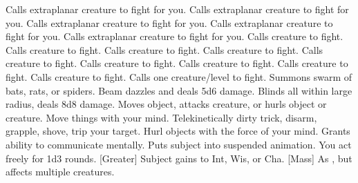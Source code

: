     {Calls extraplanar creature to fight for you.}
    {Calls extraplanar creature to fight for you.}
    {Calls extraplanar creature to fight for you.}
    {Calls extraplanar creature to fight for you.}
    {Calls extraplanar creature to fight for you.}
    {Calls creature to fight.}
    {Calls creature to fight.}
    {Calls creature to fight.}
    {Calls creature to fight.}
    {Calls creature to fight.}
    {Calls creature to fight.}
    {Calls creature to fight.}
    {Calls creature to fight.}
    {Calls creature to fight.}
    {Calls one creature/level to fight.}
    {Summons swarm of bats, rats, or spiders.}
    {Beam dazzles and deals 5d6 damage.}
    {Blinds all within large radius, deals 8d8 damage.}
    {Moves object, attacks creature, or hurls object or creature.}
    {Move things with your mind.}
    {Telekinetically dirty trick, disarm, grapple, shove, trip your target.}
    {Hurl objects with the force of your mind.}
    {Grants ability to communicate mentally. }
    {Puts subject into suspended animation.}
    {You act freely for 1d3 rounds.}
[Greater]
    {Subject gains  to Int, Wis, or Cha.}
[Mass]
    {As , but affects multiple creatures.}
